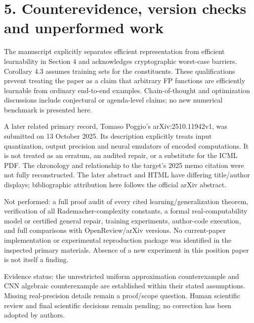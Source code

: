 \documentclass[10pt]{article}
\begin{document}
\section*{5. Counterevidence, version checks and unperformed work}
The manuscript explicitly separates efficient representation from efficient learnability in Section 4 and acknowledges cryptographic worst-case barriers. Corollary 4.3 assumes training sets for the constituents. These qualifications prevent treating the paper as a claim that arbitrary FP functions are efficiently learnable from ordinary end-to-end examples. Chain-of-thought and optimization discussions include conjectural or agenda-level claims; no new numerical benchmark is presented here.\par
A later related primary record, Tomaso Poggio’s arXiv:2510.11942v1, was submitted on 13 October 2025. Its description explicitly treats input quantization, output precision and neural emulators of encoded computations. It is not treated as an erratum, an audited repair, or a substitute for the ICML PDF. The chronology and relationship to the target’s 2025 memo citation were not fully reconstructed. The later abstract and HTML have differing title/author displays; bibliographic attribution here follows the official arXiv abstract.\par
Not performed: a full proof audit of every cited learning/generalization theorem, verification of all Rademacher-complexity constants, a formal real-computability model or certified general repair, training experiments, author-code execution, and full comparisons with OpenReview/arXiv versions. No current-paper implementation or experimental reproduction package was identified in the inspected primary materials. Absence of a new experiment in this position paper is not itself a finding.\par
Evidence status: the unrestricted uniform approximation counterexample and CNN algebraic counterexample are established within their stated assumptions. Missing real-precision details remain a proof/scope question. Human scientific review and final scientific decisions remain pending; no correction has been adopted by authors.\par
\end{document}
